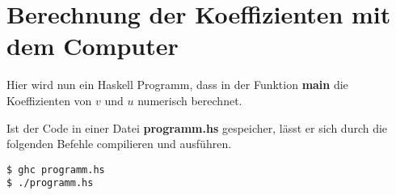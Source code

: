 \chapter{Berechnung der Koeffizienten mit dem Computer}
Hier wird nun ein Haskell Programm, dass in der Funktion \textbf{main} die
Koeffizienten von $v$ und $u$ numerisch berechnet.


Ist der Code in einer Datei \textbf{programm.hs} gespeicher, lässt er sich
durch die folgenden Befehle compilieren und ausführen.
\begin{lstlisting}[style=Bash]
$ ghc programm.hs
$ ./programm.hs
\end{lstlisting}

